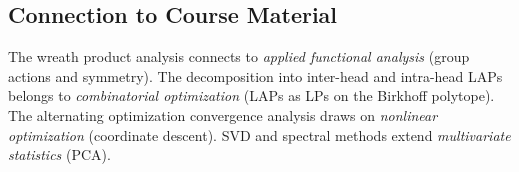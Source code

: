 \subsection{Connection to Course Material}

The wreath product analysis connects to \emph{applied functional analysis} (group actions and symmetry). The decomposition into inter-head and intra-head LAPs belongs to \emph{combinatorial optimization} (LAPs as LPs on the Birkhoff polytope). The alternating optimization convergence analysis draws on \emph{nonlinear optimization} (coordinate descent). SVD and spectral methods extend \emph{multivariate statistics} (PCA).
